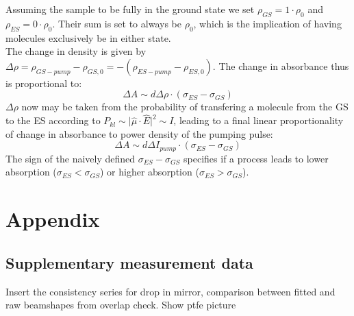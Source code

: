\documentclass[twoside,openright]{scrreprt}
\begin{document}
Assuming the sample to be fully in the ground state we set $\rho _{GS} = 1\cdot \rho_0$ and $\rho_{ES} = 0 \cdot \rho_0$. Their sum is set to always be $\rho_0$, which is the implication of having molecules exclusively be in either state.\\
The change in density is given by $\Delta \rho = \rho_{GS-pump} - \rho_{GS,0} = - \left(\rho_{ES-pump} - \rho_{ES,0}\right)$. The change in absorbance thus is proportional to:
\begin{equation}
\Delta A \sim d \Delta \rho\cdot\left(\sigma_{ES}-\sigma_{GS}\right)
\end{equation}
$\Delta \rho$ now may be taken from the probability of transfering a molecule from the GS to the ES according to $P_{kl}\sim \lvert\hat{\mu}\cdot\hat{E}\rvert^2 \sim I$, leading to a final linear proportionality of change in absorbance to power density of the pumping pulse:
\begin{equation}
\Delta A \sim d \Delta I_{pump}\cdot\left(\sigma_{ES}-\sigma_{GS}\right)
\end{equation}
The sign of the naively defined $\sigma_{ES} - \sigma_{GS}$ specifies if a process leads to lower absorption ($\sigma_{ES} < \sigma_{GS}$) or higher absorption ($\sigma_{ES} > \sigma_{GS}$).

\chapter*{Appendix}
\section*{Supplementary measurement data}
Insert the consistency series for drop in mirror, comparison between fitted and raw beamshapes from overlap check. Show ptfe picture
\end{document}
